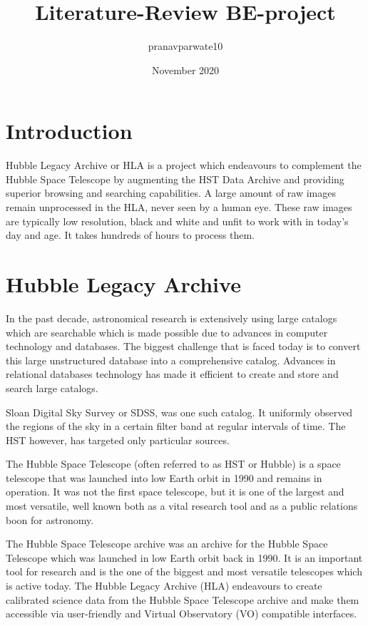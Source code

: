 \documentclass{article}
\title{Literature-Review BE-project}
\author{pranavparwate10 }
\date{November 2020}
\begin{document}
\maketitle

\section{Introduction}

Hubble Legacy Archive or HLA is a project which endeavours to complement the Hubble Space Telescope by augmenting the HST Data Archive and providing superior browsing and searching capabilities. A large amount of raw images remain unprocessed in the HLA, never seen by a human eye. These raw images are typically low resolution, black and white and unfit to work with in today's day and age. It takes hundreds of hours to process them.


\section{Hubble Legacy Archive}


In the past decade, astronomical research is extensively using large catalogs which are searchable which is made possible due to advances in computer technology and databases. The biggest challenge that is faced today is to convert this  large unstructured database into a comprehensive catalog. Advances in relational databases technology has made it efficient to create and store and search large catalogs. 

Sloan Digital Sky Survey or SDSS, was one such catalog. It uniformly observed the regions of the sky in a certain filter band at regular intervals of time. The HST however, has targeted only particular sources.

The Hubble Space Telescope (often referred to as HST or Hubble) is a space telescope that was launched into low Earth orbit in 1990 and remains in operation. It was not the first space telescope, but it is one of the largest and most versatile, well known both as a vital research tool and as a public relations boon for astronomy.

The Hubble Space Telescope archive was an archive for the Hubble Space Telescope which was launched in low Earth orbit back in 1990. It is an important tool for research and is the one of the biggest and most versatile telescopes which is active today.
The Hubble Legacy Archive (HLA) endeavours to create calibrated science data from the Hubble Space Telescope archive and make them accessible via user-friendly and Virtual Observatory (VO) compatible interfaces. 
\end{document}
